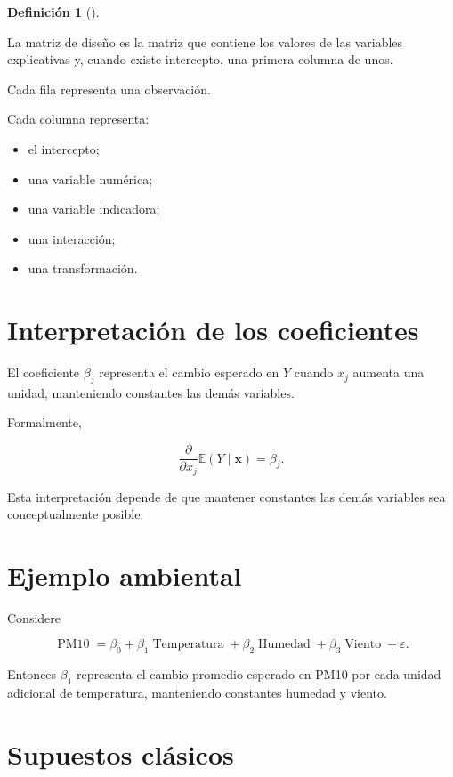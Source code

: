 \documentclass[
  spanish,
  11pt,
  letterpaper,
  DIV=11,
  numbers=noendperiod]{scrreprt}
\providecommand{\tightlist}{%
  \setlength{\itemsep}{0pt}\setlength{\parskip}{0pt}}
\theoremstyle{definition}
\newtheorem{definition}{Definición}[chapter]
\theoremstyle{plain}
\theoremstyle{definition}
\theoremstyle{remark}
\begin{document}
\begin{definition}[]\protect\hypertarget{def-matriz-diseno}{}\label{def-matriz-diseno}

La matriz de diseño es la matriz que contiene los valores de las
variables explicativas y, cuando existe intercepto, una primera columna
de unos.

\end{definition}

Cada fila representa una observación.

Cada columna representa:

\begin{itemize}
\tightlist
\item
  el intercepto;
\item
  una variable numérica;
\item
  una variable indicadora;
\item
  una interacción;
\item
  una transformación.
\end{itemize}

\section{Interpretación de los
coeficientes}\label{interpretaciuxf3n-de-los-coeficientes}

El coeficiente \(\beta_j\) representa el cambio esperado en \(Y\) cuando
\(x_j\) aumenta una unidad, manteniendo constantes las demás variables.

Formalmente,

\[
\frac{\partial}{\partial x_j}
\mathbb{E}(Y\mid\mathbf{x})
=
\beta_j.
\]

Esta interpretación depende de que mantener constantes las demás
variables sea conceptualmente posible.

\section{Ejemplo ambiental}\label{ejemplo-ambiental}

Considere

\[
\operatorname{PM10}
=
\beta_0
+
\beta_1\operatorname{Temperatura}
+
\beta_2\operatorname{Humedad}
+
\beta_3\operatorname{Viento}
+
\varepsilon.
\]

Entonces \(\beta_1\) representa el cambio promedio esperado en PM10 por
cada unidad adicional de temperatura, manteniendo constantes humedad y
viento.

\section{Supuestos clásicos}\label{supuestos-cluxe1sicos-1}
\end{document}
